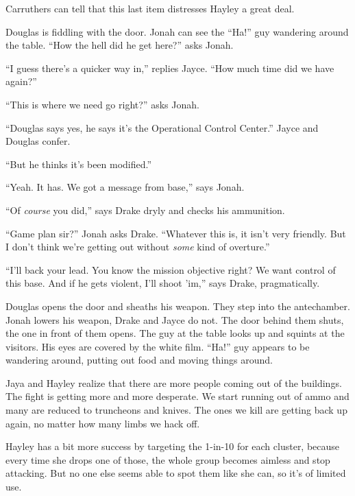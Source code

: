 Carruthers can tell that this last item distresses Hayley a great deal.





Douglas is fiddling with the door.  Jonah can see the ``Ha!'' guy wandering around the table.  ``How the hell did he get here?'' asks Jonah.

``I guess there's a quicker way in,'' replies Jayce.  ``How much time did we have again?''

``This is where we need go right?'' asks Jonah.

``Douglas says yes, he says it's the Operational Control Center.''  Jayce and Douglas confer.

``But he thinks it's been modified.''

``Yeah.  It has.  We got a message from base,'' says Jonah.

``Of \textit{course} you did,'' says Drake dryly and checks his ammunition.

``Game plan sir?'' Jonah asks Drake.  ``Whatever this is, it isn't very friendly.  But I don't think we're getting out without \textit{some} kind of overture.''

``I'll back your lead.  You know the mission objective right?  We want control of this base.  And if he gets violent, I'll shoot 'im,'' says Drake, pragmatically.



Douglas opens the door and sheaths his weapon.  They step into the antechamber.   Jonah lowers his weapon, Drake and Jayce do not.  The door behind them shuts, the one in front of them opens.  The guy at the table looks up and squints at the visitors.  His eyes are covered by the white film.  ``Ha!'' guy appears to be wandering around, putting out food and moving things around.





Jaya and Hayley realize that there are more people coming out of the buildings.   The fight is getting more and more desperate.  We start running out of ammo and many are reduced to truncheons and knives.  The ones we kill are getting back up again, no matter how many limbs we hack off. 



Hayley has a bit more success by targeting the 1-in-10 for each cluster, because every time she drops one of those, the whole group becomes aimless and stop attacking.  But no one else seems able to spot them like she can, so it's of limited use.



